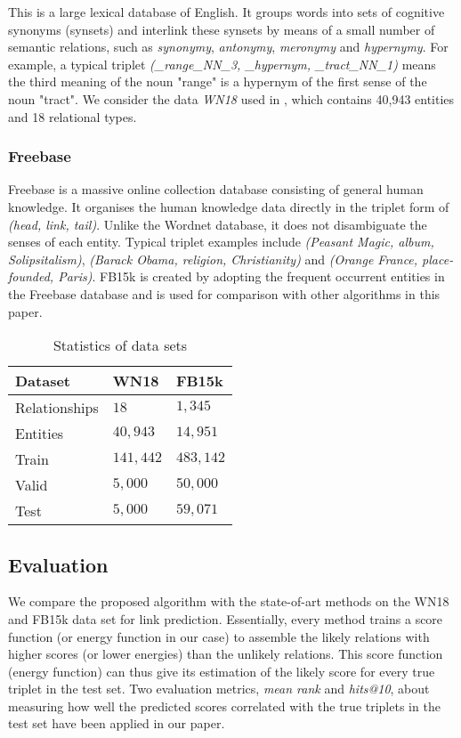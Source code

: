 \documentclass[9pt]{sig-alternate-05-2015}
\begin{document}
This is a large lexical database of English. It groups words into sets of cognitive synonyms (synsets) and interlink these synsets by means of a small number of semantic relations, such as \emph{synonymy}, \emph{antonymy}, \emph{meronymy} and \emph{hypernymy}.  For example, a typical triplet \emph{(\_range\_NN\_3, \_hypernym, \_tract\_NN\_1)} means the third meaning of the noun "range"  is a hypernym of the first sense of the noun "tract". We consider the data \emph{WN18} used in \cite{bordes_semantic_2014}, which contains 40,943 entities and 18 relational types.

\subsubsection{Freebase} 
Freebase is a massive online collection database consisting of general human knowledge. It organises the human knowledge data  directly in the triplet form of \emph{(head, link, tail)}. Unlike the Wordnet database, it does not disambiguate the senses of each entity. Typical triplet examples include \emph{(Peasant Magic, album, Solipsitalism)}, \emph{(Barack Obama, religion, Christianity)} and \emph{(Orange France, place-founded, Paris)}. FB15k \cite{bordes_learning_2011} is created by adopting the frequent occurrent entities in the Freebase database and is used for comparison with other algorithms in this paper.

\begin{table}[t]
\caption{Statistics of data sets} \label{data}
\centering
\begin{tabular}[center]{|l |l l |} 
 \hline
Dataset & WN18 & FB15k \\
 \hline 
Relationships & $18$ & $1,345$ \\
Entities & $40,943$ & $14,951$ \\
Train & $141,442$ & $483,142$ \\
Valid & $5,000$ & $50,000$ \\
Test & $5,000$ & $59,071$ \\
\hline
 \end{tabular}
 \end{table}
 
\subsection{Evaluation}
We compare the proposed algorithm with the state-of-art  methods on the WN18 and FB15k data set for link prediction. Essentially, every method trains a score function (or energy function in our case) to assemble the likely relations with higher scores (or lower energies) than the unlikely relations. This score function (energy function) can thus give its estimation of the likely score for every true triplet in the test set. Two evaluation metrics\cite{bordes_learning_2011}, \emph{mean rank} and \emph{hits@10}, about measuring how well the predicted scores correlated with the true triplets in the test set have been applied in our paper.
\end{document}
